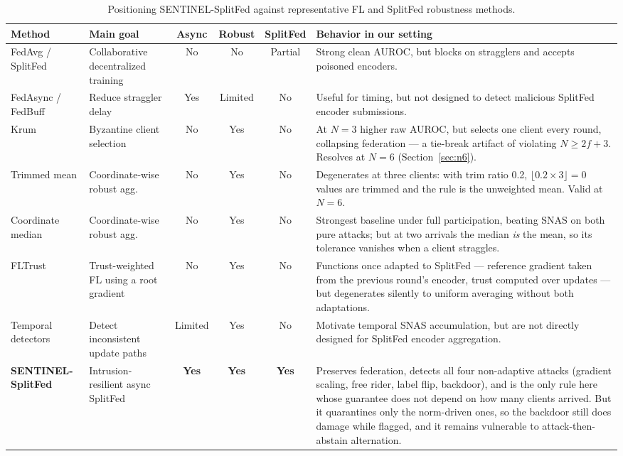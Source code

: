 \documentclass[pdflatex,sn-mathphys-num]{sn-jnl}
\begin{document}
\begin{table}[htbp]
\caption{Positioning SENTINEL-SplitFed against representative FL and SplitFed robustness methods.}
\label{tab:sota-positioning}
\centering
\scriptsize
\setlength{\tabcolsep}{3pt}
\renewcommand{\arraystretch}{1.18}
\begin{tabularx}{\textwidth}{@{}>{\raggedright\arraybackslash}p{2.15cm}>{\raggedright\arraybackslash}p{2.35cm}ccc>{\raggedright\arraybackslash}X@{}}
\toprule
Method & Main goal & Async & Robust & SplitFed & Behavior in our setting \\
\midrule

FedAvg / SplitFed
& Collaborative decentralized training
& No
& No
& Partial
& Strong clean AUROC, but blocks on stragglers and accepts poisoned encoders. \\

FedAsync / FedBuff
& Reduce straggler delay
& Yes
& Limited
& No
& Useful for timing, but not designed to detect malicious SplitFed encoder submissions. \\

Krum
& Byzantine client selection
& No
& Yes
& No
& At $N=3$ higher raw AUROC, but selects one client every round, collapsing federation --- a tie-break artifact of violating $N\geq2f+3$. Resolves at $N=6$ (Section~\ref{sec:n6}). \\

Trimmed mean
& Coordinate-wise robust agg.
& No
& Yes
& No
& Degenerates at three clients: with trim ratio 0.2, $\lfloor0.2\times3\rfloor=0$ values are trimmed and the rule is the unweighted mean. Valid at $N=6$. \\

Coordinate median
& Coordinate-wise robust agg.
& No
& Yes
& No
& Strongest baseline under full participation, beating SNAS on both pure attacks; but at two arrivals the median \emph{is} the mean, so its tolerance vanishes when a client straggles. \\

FLTrust
& Trust-weighted FL using a root gradient
& No
& Yes
& No
& Functions once adapted to SplitFed --- reference gradient taken from the previous round's encoder, trust computed over updates --- but degenerates silently to uniform averaging without both adaptations. \\

Temporal detectors
& Detect inconsistent update paths
& Limited
& Yes
& No
& Motivate temporal SNAS accumulation, but are not directly designed for SplitFed encoder aggregation. \\

\textbf{SENTINEL-SplitFed}
& Intrusion-resilient async SplitFed
& \textbf{Yes}
& \textbf{Yes}
& \textbf{Yes}
& Preserves federation, detects all four non-adaptive attacks (gradient scaling, free rider, label flip, backdoor), and is the only rule here whose guarantee does not depend on how many clients arrived. But it quarantines only the norm-driven ones, so the backdoor still does damage while flagged, and it remains vulnerable to attack-then-abstain alternation. \\

\bottomrule
\end{tabularx}
\end{table}
\end{document}
